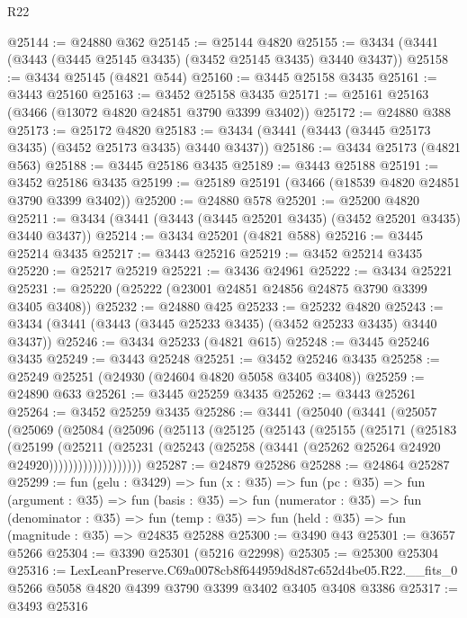 \begin{lexlean}{R22}
\begin{coremodule}
@25144 := @24880 @362
@25145 := @25144 @4820
@25155 := @3434 (@3441 (@3443 (@3445 @25145 @3435) (@3452 @25145 @3435) @3440 @3437))
@25158 := @3434 @25145 (@4821 @544)
@25160 := @3445 @25158 @3435
@25161 := @3443 @25160
@25163 := @3452 @25158 @3435
@25171 := @25161 @25163 (@3466 (@13072 @4820 @24851 @3790 @3399 @3402))
@25172 := @24880 @388
@25173 := @25172 @4820
@25183 := @3434 (@3441 (@3443 (@3445 @25173 @3435) (@3452 @25173 @3435) @3440 @3437))
@25186 := @3434 @25173 (@4821 @563)
@25188 := @3445 @25186 @3435
@25189 := @3443 @25188
@25191 := @3452 @25186 @3435
@25199 := @25189 @25191 (@3466 (@18539 @4820 @24851 @3790 @3399 @3402))
@25200 := @24880 @578
@25201 := @25200 @4820
@25211 := @3434 (@3441 (@3443 (@3445 @25201 @3435) (@3452 @25201 @3435) @3440 @3437))
@25214 := @3434 @25201 (@4821 @588)
@25216 := @3445 @25214 @3435
@25217 := @3443 @25216
@25219 := @3452 @25214 @3435
@25220 := @25217 @25219
@25221 := @3436 @24961
@25222 := @3434 @25221
@25231 := @25220 (@25222 (@23001 @24851 @24856 @24875 @3790 @3399 @3405 @3408))
@25232 := @24880 @425
@25233 := @25232 @4820
@25243 := @3434 (@3441 (@3443 (@3445 @25233 @3435) (@3452 @25233 @3435) @3440 @3437))
@25246 := @3434 @25233 (@4821 @615)
@25248 := @3445 @25246 @3435
@25249 := @3443 @25248
@25251 := @3452 @25246 @3435
@25258 := @25249 @25251 (@24930 (@24604 @4820 @5058 @3405 @3408))
@25259 := @24890 @633
@25261 := @3445 @25259 @3435
@25262 := @3443 @25261
@25264 := @3452 @25259 @3435
@25286 := @3441
    (@25040
      (@3441
        (@25057
          (@25069
            (@25084
              (@25096
                (@25113
                  (@25125
                    (@25143
                      (@25155
                        (@25171
                          (@25183
                            (@25199
                              (@25211
                                (@25231
                                  (@25243
                                    (@25258 (@3441 (@25262 @25264 @24920 @24920)))))))))))))))))))
@25287 := @24879 @25286
@25288 := @24864 @25287
@25299 := fun (gelu : @3429) =>
  fun (x : @35) =>
  fun (pc : @35) =>
  fun (argument : @35) =>
  fun (basis : @35) =>
  fun (numerator : @35) =>
  fun (denominator : @35) =>
  fun (temp : @35) => fun (held : @35) => fun (magnitude : @35) => @24835 @25288
@25300 := @3490 @43
@25301 := @3657 @5266
@25304 := @3390 @25301 (@5216 @22998)
@25305 := @25300 @25304
@25316 := LexLeanPreserve.C69a0078cb8f644959d8d87c652d4be05.R22.__fits_0
    @5266
    @5058
    @4820
    @4399
    @3790
    @3399
    @3402
    @3405
    @3408
    @3386
@25317 := @3493 @25316

\end{coremodule}
\end{lexlean}
